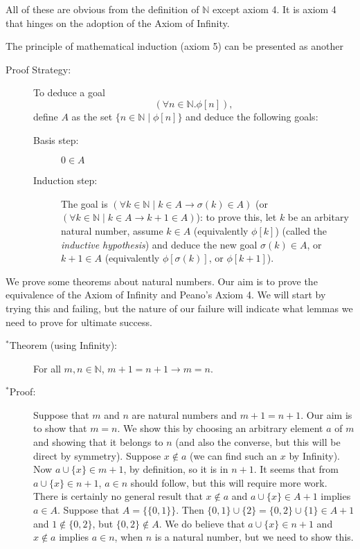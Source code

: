 \documentclass[12pt]{book}
\begin{document}
All of these are obvious from the definition of ${\mathbb N}$ except
axiom 4.  It is axiom 4 that hinges on the adoption of the Axiom of
Infinity.

The principle of mathematical induction (axiom 5) can be presented as
another

\begin{description}

\item[Proof Strategy:] To deduce a goal $$(\forall n \in {\mathbb
N}.\phi[n]),$$ define $A$ as the set $\{n \in {\mathbb N}\mid \phi[n]\}$ and deduce the following goals:

\begin{description}
\item[Basis step:] $0 \in A$

\item[Induction step:] The goal is $(\forall k \in {\mathbb N}\mid k
\in A \rightarrow \sigma(k) \in A)$ (or $(\forall k \in {\mathbb N}\mid k
\in A \rightarrow k+1 \in A)$): to prove this, let $k$ be an arbitary
natural number, assume $k \in A$ (equivalently $\phi[k]$) (called the
{\em inductive hypothesis\/}) and deduce the new goal $\sigma(k) \in A$, or $k+1 \in A$
(equivalently $\phi[\sigma(k)]$, or $\phi[k+1]$).

\end{description}

\end{description}

We prove some theorems about natural numbers.   Our aim is to prove the equivalence of the Axiom of Infinity and Peano's Axiom 4.  We will start by trying this and failing, but the nature of our failure will indicate what lemmas we need to prove for ultimate success.

\begin{description}

\item[$^*$Theorem (using Infinity):]   For all $m,n \in {\mathbb N}$, $m+1=n+1\rightarrow m=n$.

\item[$^*$Proof:]  Suppose that $m$ and $n$ are natural numbers and $m+1=n+1$.   Our aim is to show that $m=n$.   We show this by choosing an arbitrary element
$a$ of $m$ and showing that it belongs to $n$ (and also the converse, but this will be direct by symmetry).  Suppose $x \not\in a$ (we can find such an $x$ by Infinity).
Now $a \cup \{x\} \in m+1$, by definition, so it is in $n+1$.  It seems that from $a \cup \{x\} \in n+1$, $a \in n$ should follow, but this will require more work.   There is certainly
no general result that $x \not\in a$ and $a \cup \{x\} \in A + 1$ implies $a \in A$.   Suppose that $A = \{\{0,1\}\}$.   Then $\{0,1\} \cup \{2\} = \{0,2\} \cup \{1\} \in A +1$ and $1 \not\in \{0,2\}$, but $\{0,2\} \not\in A$.  We do believe that $a \cup \{x\} \in n+1$ and $x \not\in a$ implies $a \in n$, when $n$ is a natural number, but we need to show this.

\end{description}
\end{document}
